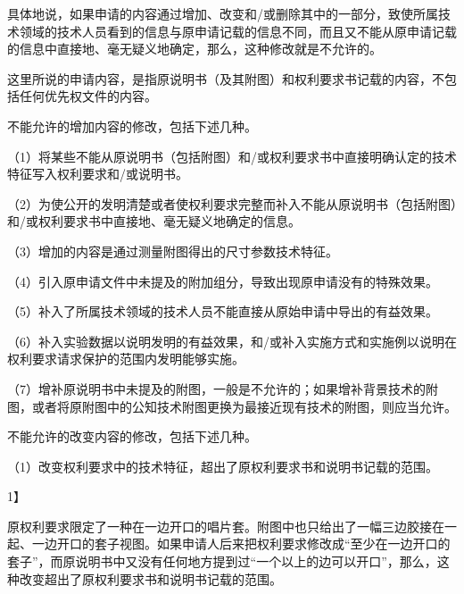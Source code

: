 具体地说，如果申请的内容通过增加、改变和/或删除其中的一部分，致使所属技术领域的技术人员看到的信息与原申请记载的信息不同，而且又不能从原申请记载的信息中直接地、毫无疑义地确定，那么，这种修改就是不允许的。

这里所说的申请内容，是指原说明书（及其附图）和权利要求书记载的内容，不包括任何优先权文件的内容。

不能允许的增加内容的修改，包括下述几种。

{\setlength{\parindent}{17.1bp}（1）将某些不能从原说明书（包括附图）和/或权利要求书中直接明确认定的技术特征写入权利要求和/或说明书。\par}

{\setlength{\parindent}{17.1bp}（2）为使公开的发明清楚或者使权利要求完整而补入不能从原说明书（包括附图）和/或权利要求书中直接地、毫无疑义地确定的信息。\par}

{\setlength{\parindent}{17.1bp}（3）增加的内容是通过测量附图得出的尺寸参数技术特征。\par}

{\setlength{\parindent}{17.1bp}（4）引入原申请文件中未提及的附加组分，导致出现原申请没有的特殊效果。\par}

{\setlength{\parindent}{17.1bp}（5）补入了所属技术领域的技术人员不能直接从原始申请中导出的有益效果。\par}

{\setlength{\parindent}{17.1bp}（6）补入实验数据以说明发明的有益效果，和/或补入实施方式和实施例以说明在权利要求请求保护的范围内发明能够实施。\par}

{\setlength{\parindent}{17.1bp}（7）增补原说明书中未提及的附图，一般是不允许的；如果增补背景技术的附图，或者将原附图中的公知技术附图更换为最接近现有技术的附图，则应当允许。\par}

不能允许的改变内容的修改，包括下述几种。

{\setlength{\parindent}{17.1bp}（1）改变权利要求中的技术特征，超出了原权利要求书和说明书记载的范围。\par}

{1{\kaiti 】}\par}

原权利要求限定了一种在一边开口的唱片套。附图中也只给出了一幅三边胶接在一起、一边开口的套子视图。如果申请人后来把权利要求修改成“至少在一边开口的套子”，而原说明书中又没有任何地方提到过“一个以上的边可以开口”，那么，这种改变超出了原权利要求书和说明书记载的范围。

